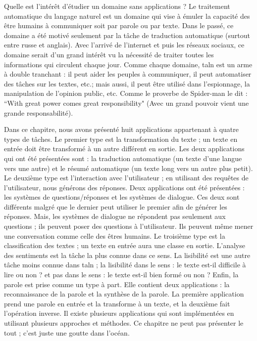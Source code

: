 \documentclass{KodeBook}
\begin{document}
\begin{discussion}
Quelle est l'intérêt d'étudier un domaine sans applications ? 
Le traitement automatique du langage naturel est un domaine qui vise à émuler la capacité des être humains à communiquer soit par parole ou par texte. 
Dans le passé, ce domaine a été motivé seulement par la tâche de traduction automatique (surtout entre russe et anglais). 
Avec l'arrivé de l'internet et puis les réseaux sociaux, ce domaine serait d'un grand intérêt vu la nécessité de traiter toutes les informations qui circulent chaque jour. 
Comme chaque domaine, \ac{taln} est un arme à double tranchant : il peut aider les peuples à communiquer, il peut automatiser des tâches sur les textes, etc.; mais aussi, il peut être utilisé dans l'espionnage, la manipulation de l'opinion public, etc. 
Comme le proverbe de Spider-man le dit : ``With great power comes great responsibility" (Avec un grand pouvoir vient une grande responsabilité). 

Dans ce chapitre, nous avons présenté huit applications appartenant à quatre types de tâches. 
Le premier type est la transformation du texte ; un texte en entrée doit être transformé à un autre différent en sortie. 
Les deux applications qui ont été présentées sont : la traduction automatique (un texte d'une langue vers une autre) et le résumé automatique (un texte long vers un autre plus petit). 
Le deuxième type est l'interaction avec l'utilisateur ; en utilisant des requêtes de l'utilisateur, nous générons des réponses. 
Deux applications ont été présentées : les systèmes de questions/réponses et les systèmes de dialogue.
Ces deux sont différents malgré que le dernier peut utiliser le premier afin de générer les réponses. 
Mais, les systèmes de dialogue ne répondent pas seulement aux questions ; ils peuvent poser des questions à l'utilisateur.
Ils peuvent même mener une conversation comme celle des êtres humains. 
Le troisième type est la classification des textes ; un texte en entrée aura une classe en sortie. 
L'analyse des sentiments est la tâche la plus connue dans ce sens.
La lisibilité est une autre tâche moins connue dans \ac{taln} ; la lisibilité dans le sens : le texte est-il difficile à lire ou non ? et pas dans le sens : le texte est-il bien formé ou non ?
Enfin, la parole est prise comme un type à part. 
Elle contient deux applications : la reconnaissance de la parole et la synthèse de la parole. 
La première application prend une parole en entrée et la transforme à un texte, et la deuxième fait l'opération inverse.
Il existe plusieurs applications qui sont implémentées en utilisant plusieurs approches et méthodes. 
Ce chapitre ne peut pas présenter le tout ; c'est juste une goutte dans l'océan.
\end{discussion}
\end{document}
